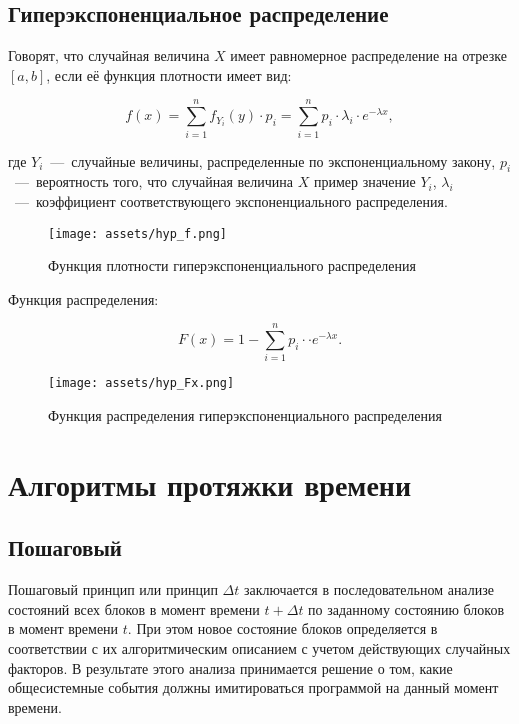 \subsection{Гиперэкспоненциальное распределение}

Говорят, что случайная величина $X$ имеет равномерное распределение на отрезке $[a,b]$, если её функция плотности имеет вид:

\begin{equation}
    f (x) = \sum_{i=1}^{n} f_{Y_i}(y) \cdot p_i = \sum_{i=1}^{n} p_i \cdot \lambda_i \cdot e^{-\lambda x},
\end{equation}

\noindent где $Y_i$~---~случайные величины, распределенные по экспоненциальному закону, $p_i$~---~вероятность того, что случайная величина $X$ пример значение $Y_i$, $\lambda_i$~---~коэффициент соответствующего экспоненциального распределения.

\begin{figure}[H]
    \begin{center}
    \texttt{[image: assets/hyp\_f.png]}
    \caption{Функция плотности гиперэкспоненциального распределения}
    \label{fig:}
    \end{center}
\end{figure}

\newpage

Функция распределения:

\begin{equation}
F (x) = 1 - \sum_{i=1}^{n} p_i \cdot \cdot e^{-\lambda x}.
\end{equation}

\begin{figure}[H]
    \begin{center}
    \texttt{[image: assets/hyp\_Fx.png]}
    \caption{Функция распределения гиперэкспоненциального распределения}
    \label{fig:}
    \end{center}
\end{figure}

\section{Алгоритмы протяжки времени}

\subsection{Пошаговый}

Пошаговый принцип или принцип $\Delta t$ заключается в последовательном анализе состояний всех блоков в момент времени $t + \Delta t$ по заданному состоянию блоков в момент времени $t$.
При этом новое состояние блоков определяется в соответствии с их алгоритмическим описанием с учетом действующих случайных факторов. 
В результате этого анализа принимается решение о том, какие общесистемные события должны имитироваться программой на данный момент времени.

